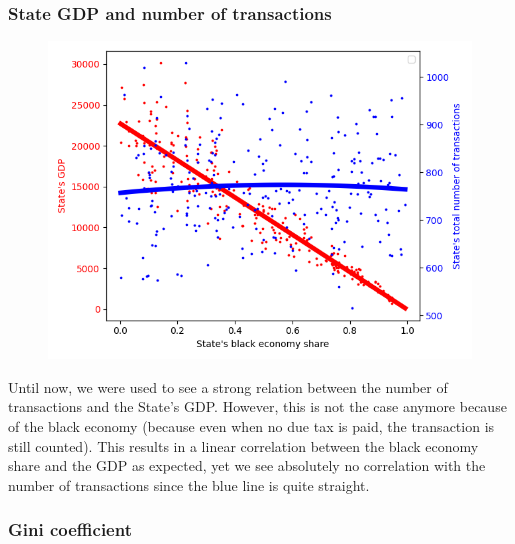 {{{{            
        \subsubsection{State GDP and number of transactions}

        \begin{figure}
            \includegraphics[width=\linewidth]{img/exp/7_1.png}
        \end{figure} 
        {Until now, we were used to see a strong relation between the number of transactions and the State's GDP. However, this is not the case anymore because of the black economy (because even when no due tax is paid, the transaction is still counted). This results in a linear correlation between the black economy share and the GDP as expected, yet we see absolutely no correlation with the number of transactions since the blue line is quite straight.
        \par

        \subsubsection{Gini coefficient}

}}}}}
